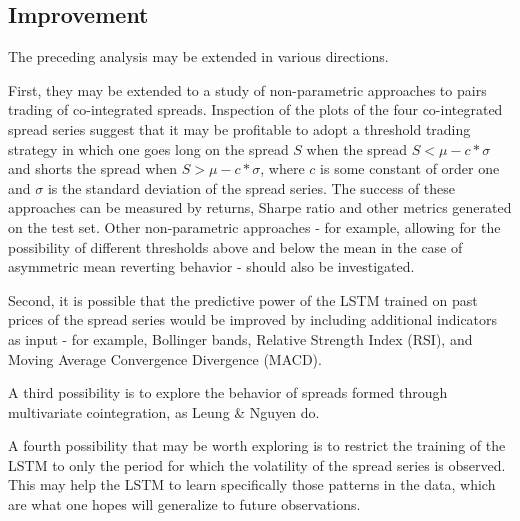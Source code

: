 \documentclass{article}
\begin{document}
\subsection{Improvement}

The preceding analysis may be extended in various directions. 

First, they may be extended to a study of non-parametric approaches to pairs trading of co-integrated spreads. Inspection of the plots of the four co-integrated spread series suggest that it may be profitable to adopt a threshold trading strategy in which one goes long on the spread $S$ when the spread $S < \mu -  c * \sigma$ and shorts the spread when $S > \mu -  c * \sigma$, where $c$ is some constant of order one and $\sigma$ is the standard deviation of the spread series. The success of these approaches can be measured by returns, Sharpe ratio and other metrics generated on the test set. Other non-parametric approaches - for example, allowing for the possibility of different thresholds above and below the mean in the case of asymmetric mean reverting behavior - should also be investigated. 

Second, it is possible that the predictive power of the LSTM trained on past prices of the spread series would be improved by including additional indicators as input - for example, Bollinger bands, Relative Strength Index (RSI), and Moving Average Convergence Divergence (MACD). 

A third possibility is to explore the behavior of spreads formed through multivariate cointegration, as Leung \& Nguyen do. 

A fourth possibility that may be worth exploring is to restrict the training of the LSTM to only the period for which the volatility of the spread series is observed. This may help the LSTM to learn specifically those patterns in the data, which are what one hopes will generalize to future observations. 



\def\bibsection{\section*{References}}
\scriptsize


\end{document}
